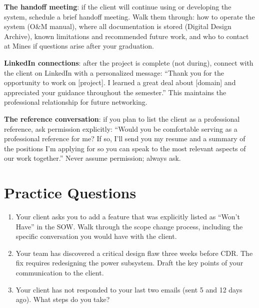 \textbf{The handoff meeting}: if the client will continue using or developing the system, schedule a brief handoff meeting. Walk them through: how to operate the system (O\&M manual), where all documentation is stored (Digital Design Archive), known limitations and recommended future work, and who to contact at Mines if questions arise after your graduation.

\textbf{LinkedIn connections}: after the project is complete (not during), connect with the client on LinkedIn with a personalized message: ``Thank you for the opportunity to work on [project]. I learned a great deal about [domain] and appreciated your guidance throughout the semester.'' This maintains the professional relationship for future networking.

\textbf{The reference conversation}: if you plan to list the client as a professional reference, ask permission explicitly: ``Would you be comfortable serving as a professional reference for me? If so, I'll send you my resume and a summary of the positions I'm applying for so you can speak to the most relevant aspects of our work together.'' Never assume permission; always ask.


\section{Practice Questions}
\begin{enumerate}[leftmargin=1.5em]
\item Your client asks you to add a feature that was explicitly listed as ``Won't Have'' in the SOW. Walk through the scope change process, including the specific conversation you would have with the client.
\item Your team has discovered a critical design flaw three weeks before CDR. The fix requires redesigning the power subsystem. Draft the key points of your communication to the client.
\item Your client has not responded to your last two emails (sent 5 and 12 days ago). What steps do you take?
\end{enumerate}


